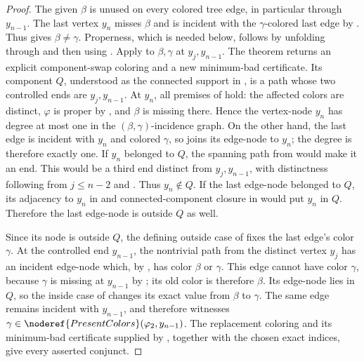 \begin{proof}
The given \(\beta\) is unused on every colored tree edge, in particular
through \(y_{n-1}\).  The last vertex \(y_n\) misses \(\beta\) and is
incident with the \(\gamma\)-colored last edge by
.  Thus  gives
\(\beta\ne\gamma\).  Properness, which is needed below, follows by
unfolding  through
 and then using .
Apply  to
\(\beta,\gamma\) at \(y_j,y_{n-1}\).  The theorem returns an explicit
component-swap coloring and a new minimum-bad certificate.  Its
component \(Q\), understood as the connected support in
, is a path whose two controlled ends are
\(y_j,y_{n-1}\).  At \(y_n\), all premises of
 hold: the affected colors are
distinct, \(\varphi\) is proper by , and \(\beta\) is
missing there.  Hence the vertex-node \(y_n\) has degree at most one in
the \((\beta,\gamma)\)-incidence graph.  On the other hand, the last edge
is incident with \(y_n\) and colored \(\gamma\), so
 joins its edge-node to \(y_n\); the
degree is therefore exactly one.  If \(y_n\) belonged to \(Q\), the
spanning path from  would make it
an end.  This would be a third end distinct from \(y_j,y_{n-1}\), with
distinctness following from \(j\le n-2\) and
.  Thus \(y_n\notin Q\).  If the last edge-node
belonged to \(Q\), its adjacency to \(y_n\) in
 and connected-component closure in
 would put \(y_n\) in \(Q\).  Therefore the
last edge-node is outside \(Q\) as well.

Since its node is outside \(Q\), the defining outside case of
 fixes the last edge's color
\(\gamma\).  At the controlled end \(y_{n-1}\), the nontrivial path from
the distinct vertex \(y_j\) has an incident edge-node which, by
, has color \(\beta\) or \(\gamma\).  This edge
cannot have color \(\gamma\), because \(\gamma\) is missing at
\(y_{n-1}\) by ; its old color is therefore
\(\beta\).  Its edge-node lies in \(Q\), so the inside case of
 changes its exact value from \(\beta\)
to \(\gamma\).  The same edge remains incident with \(y_{n-1}\), and
therefore witnesses \(\gamma\in\noderef{PresentColors}(\varphi_2,y_{n-1})\).
The replacement coloring and its
minimum-bad certificate supplied by
, together with the chosen exact
indices, give every asserted conjunct.
\end{proof}
